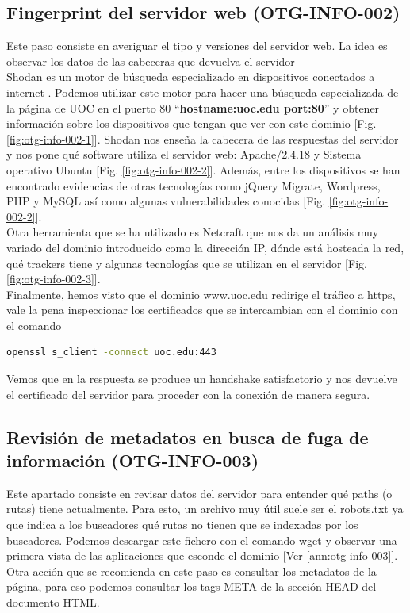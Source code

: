 \documentclass[10pt,a4paper]{article}
\begin{document}
\subsection{Fingerprint del servidor web (OTG-INFO-002)}
Este paso consiste en averiguar el tipo y versiones del servidor web. La idea es observar los datos de las cabeceras que devuelva el servidor\\

Shodan es un motor de búsqueda especializado en dispositivos conectados a internet \cite{shodan}. Podemos utilizar este motor para hacer una búsqueda especializada de la página de UOC en el puerto 80 ``\textbf{hostname:uoc.edu port:80}'' y obtener información sobre los dispositivos que tengan que ver con este dominio [Fig. \ref{fig:otg-info-002-1}].  Shodan nos enseña la cabecera de las respuestas del servidor y nos pone qué software utiliza el servidor web: Apache/2.4.18 y Sistema operativo Ubuntu [Fig. \ref{fig:otg-info-002-2}]. Además, entre los dispositivos se han encontrado evidencias de otras tecnologías como jQuery Migrate, Wordpress, PHP y MySQL así como algunas vulnerabilidades conocidas [Fig. \ref{fig:otg-info-002-2}].\\

Otra herramienta que se ha utilizado es Netcraft que nos da un análisis muy variado del dominio introducido como la dirección IP, dónde está hosteada la red, qué trackers tiene y algunas tecnologías que se utilizan en el servidor [Fig. \ref{fig:otg-info-002-3}].\\

Finalmente, hemos visto que el dominio www.uoc.edu redirige el tráfico a https, vale la pena inspeccionar los certificados que se intercambian con el dominio con el comando
\begin{lstlisting}[language=bash]
openssl s_client -connect uoc.edu:443
\end{lstlisting}
Vemos que en la respuesta se produce un handshake satisfactorio y nos devuelve el certificado del servidor para proceder con la conexión de manera segura.

\subsection{Revisión de metadatos en busca de fuga de información (OTG-INFO-003)}
Este apartado consiste en revisar datos del servidor para entender qué paths (o rutas) tiene actualmente. Para esto, un archivo muy útil suele ser el robots.txt ya que indica a los buscadores qué rutas no tienen que se indexadas por los buscadores. Podemos descargar este fichero con el comando wget y observar una primera vista de las aplicaciones que esconde el dominio [Ver \ref{ann:otg-info-003}].\\
Otra acción que se recomienda en este paso es consultar los metadatos de la página, para eso podemos consultar los tags META de la sección HEAD del documento HTML.
\end{document}
